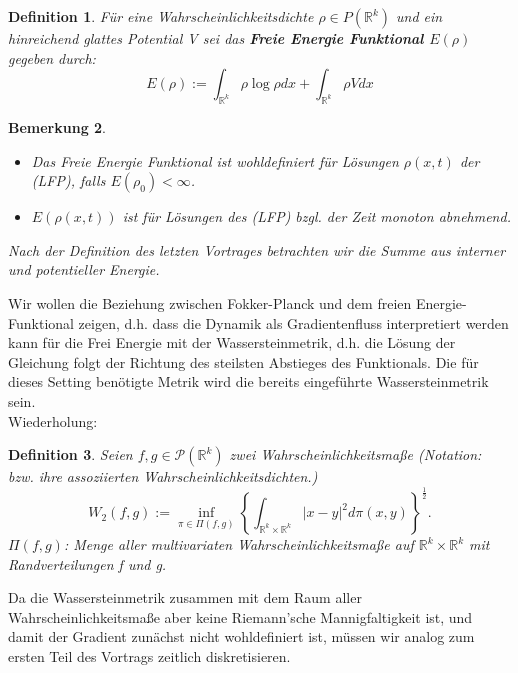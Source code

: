 \documentclass[11pt,a4paper,notitlepage]{scrreprt}
\newcommand{\RR}{\mathbb{R}}
\newtheorem{defi}{Definition}[section]
\newtheorem{bem}[defi]{Bemerkung}
\begin{document}
\begin{defi}
Für eine Wahrscheinlichkeitsdichte $\rho\in P(\RR^k)$ und ein hinreichend glattes Potential V sei das \textbf{Freie Energie Funktional $E(\rho)$} gegeben durch:
\begin{equation}
E(\rho):=\int_{\RR^k} \rho\log\rho dx + \int_{\RR^k}\rho V dx \label{FEFktn}
\end{equation}
\end{defi}

\begin{bem}
\begin{itemize}
\item Das Freie Energie Funktional ist wohldefiniert für Lösungen $\rho(x,t)$ der (LFP), falls $E(\rho_0)<\infty$.
\item $E(\rho(x,t))$ ist für Lösungen des (LFP) bzgl. der Zeit monoton abnehmend.\end{itemize}
\item Nach der Definition des letzten Vortrages betrachten wir die Summe aus interner und potentieller Energie.
\end{bem}

Wir wollen die Beziehung zwischen Fokker-Planck und dem freien Energie-Funktional zeigen, d.h. dass die Dynamik als Gradientenfluss interpretiert werden kann für die Frei Energie mit der Wassersteinmetrik, d.h. die Lösung der Gleichung folgt der Richtung des steilsten Abstieges des Funktionals. Die für dieses Setting benötigte Metrik wird die bereits eingeführte Wassersteinmetrik sein. \\

Wiederholung:
\begin{defi}
Seien $f,g\in\mathcal{P}(\RR^k)$ zwei Wahrscheinlichkeitsmaße (Notation: bzw. ihre assoziierten Wahrscheinlichkeitsdichten.)
\begin{equation}
W_2(f,g):=\inf_{\pi \in \Pi(f,g)} \left\{ \int_{\RR^k\times\RR^k} \vert x-y \vert^2 d\pi(x,y)\right\}^\frac{1}{2}.\label{W2}
\end{equation}
$\Pi(f,g)$: Menge aller multivariaten Wahrscheinlichkeitsmaße auf $\RR^k \times \RR^k$ mit Randverteilungen f und g.
\end{defi}
Da die Wassersteinmetrik zusammen mit dem Raum aller Wahrscheinlichkeitsmaße aber keine Riemann'sche Mannigfaltigkeit ist, und damit der Gradient zunächst nicht wohldefiniert ist, müssen wir analog zum ersten Teil des Vortrags zeitlich diskretisieren.\\
\end{document}
